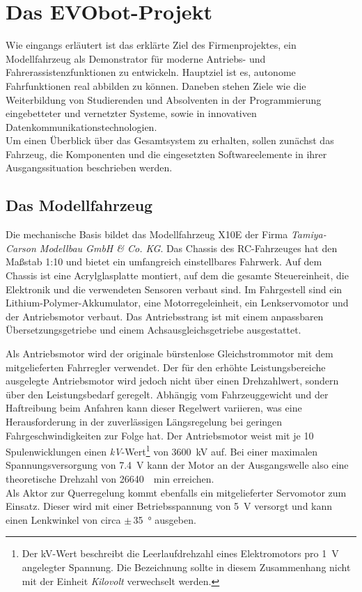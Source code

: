 \chapter{Das EVObot-Projekt} 	\label{cha:Ausgangssituation}
Wie eingangs erläutert ist das erklärte Ziel des Firmenprojektes, ein Modellfahrzeug als Demonstrator für moderne Antriebs- und Fahrerassistenzfunktionen zu entwickeln. Hauptziel ist es, autonome Fahrfunktionen real abbilden zu können. Daneben stehen Ziele wie die Weiterbildung von Studierenden und Absolventen in der Programmierung eingebetteter und vernetzter Systeme, sowie in innovativen Datenkommunikationstechnologien.\\
Um einen Überblick über das Gesamtsystem zu erhalten, sollen zunächst das Fahrzeug, die Komponenten und die eingesetzten Softwareelemente in ihrer Ausgangssituation beschrieben werden.

\section{Das Modellfahrzeug}	\label{sec:EVObotFahrzeug}

Die mechanische Basis bildet das Modellfahrzeug X10E der Firma \emph{Tamiya-Carson Modellbau GmbH \& Co. KG}. Das Chassis des RC-Fahrzeuges hat den Maßstab 1:10 und bietet ein umfangreich einstellbares Fahrwerk. Auf dem Chassis ist eine Acrylglasplatte montiert, auf dem die gesamte Steuereinheit, die Elektronik und die verwendeten Sensoren verbaut sind. Im Fahrgestell sind ein Lithium-Polymer-Akkumulator, eine Motorregeleinheit, ein Lenkservomotor und der Antriebsmotor verbaut. Das Antriebsstrang ist mit einem anpassbaren Übersetzungsgetriebe und einem Achsausgleichsgetriebe ausgestattet.

Als Antriebsmotor wird der originale bürstenlose Gleichstrommotor mit dem mitgelieferten Fahrregler verwendet. Der für den erhöhte Leistungsbereiche ausgelegte Antriebsmotor wird jedoch nicht über einen Drehzahlwert, sondern über den Leistungsbedarf geregelt. Abhängig vom Fahrzeuggewicht und der Haftreibung beim Anfahren kann dieser Regelwert variieren, was eine Herausforderung in der zuverlässigen Längsregelung bei geringen Fahrgeschwindigkeiten zur Folge hat. Der Antriebsmotor weist mit je 10 Spulenwicklungen einen \emph{kV}-Wert\footnote{Der kV-Wert beschreibt die Leerlaufdrehzahl eines Elektromotors pro \SI{1}{\volt} angelegter Spannung. Die Bezeichnung sollte in diesem Zusammenhang nicht mit der Einheit \emph{Kilovolt} verwechselt werden.} von \SI{3600}{\kilo\volt} auf. Bei einer maximalen Spannungsversorgung von \SI{7,4}{\volt} kann der Motor an der Ausgangswelle also eine theoretische Drehzahl von \SI{26640}{\per\minute} erreichen.\\
Als Aktor zur Querregelung kommt ebenfalls ein mitgelieferter Servomotor zum Einsatz. Dieser wird mit einer Betriebsspannung von \SI{5}{\volt} versorgt und kann einen Lenkwinkel von circa $\pm$\,\SI{35}{\degree} ausgeben.

